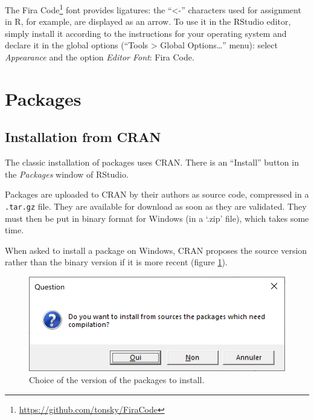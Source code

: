 \documentclass[
  12pt,
  american,
  a4paper,
  extrafontsizes,onecolumn,openright
  ]{memoir}
\begin{document}
The Fira Code\footnote{\url{https://github.com/tonsky/FiraCode}} font provides ligatures: the \enquote{\textless-} characters used for assignment in R, for example, are displayed as an arrow.
To use it in the RStudio editor, simply install it according to the instructions for your operating system and declare it in the global options (\enquote{Tools \textgreater{} Global Options\ldots{}} menu): select \emph{Appearance} and the option \emph{Editor Font}: Fira Code.

\section{Packages}\label{packages}

\subsection{Installation from CRAN}\label{installation-from-cran}

The classic installation of packages uses CRAN.
There is an \enquote{Install} button in the \emph{Packages} window of RStudio.

Packages are uploaded to CRAN by their authors as source code, compressed in a \texttt{.tar.gz} file.
They are available for download as soon as they are validated.
They must then be put in binary format for Windows (in a `.zip' file), which takes some time.

When asked to install a package on Windows, CRAN proposes the source version rather than the binary version if it is more recent (figure \ref{fig:R-BinaryPkg}).



\scriptsize

\begin{figure}

{\centering \includegraphics[width=0.8\linewidth]{images/R-BinaryPkg} 

}

\caption{Choice of the version of the packages to install.}\label{fig:R-BinaryPkg}
\end{figure}
\end{document}
